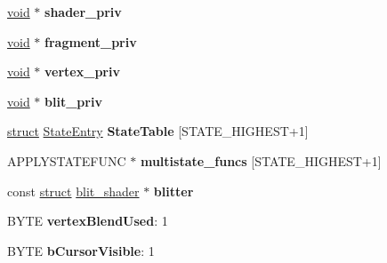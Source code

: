 \begin{DoxyCompactItemize}
\item 
\mbox{\label{structwined3d__device_a38452526a7adb7aeadeb4e82f654c290}} 
\hyperlink{interfacevoid}{void} $\ast$ {\bfseries shader\+\_\+priv}
\item 
\mbox{\label{structwined3d__device_aac1bf3c840efdf6959de17565fe1cb00}} 
\hyperlink{interfacevoid}{void} $\ast$ {\bfseries fragment\+\_\+priv}
\item 
\mbox{\label{structwined3d__device_accc9af711e4c4f877a385be8cc61a69b}} 
\hyperlink{interfacevoid}{void} $\ast$ {\bfseries vertex\+\_\+priv}
\item 
\mbox{\label{structwined3d__device_a15a452c2db8a5819ee1ce272765e54d3}} 
\hyperlink{interfacevoid}{void} $\ast$ {\bfseries blit\+\_\+priv}
\item 
\mbox{\label{structwined3d__device_a76e66f66d42b99351747a6e54a727bef}} 
\hyperlink{interfacestruct}{struct} \hyperlink{struct_state_entry}{State\+Entry} {\bfseries State\+Table} \mbox{[}S\+T\+A\+T\+E\+\_\+\+H\+I\+G\+H\+E\+ST+1\mbox{]}
\item 
\mbox{\label{structwined3d__device_a8029ef091de6e7ad06e35b37eaa7b527}} 
A\+P\+P\+L\+Y\+S\+T\+A\+T\+E\+F\+U\+NC $\ast$ {\bfseries multistate\+\_\+funcs} \mbox{[}S\+T\+A\+T\+E\+\_\+\+H\+I\+G\+H\+E\+ST+1\mbox{]}
\item 
\mbox{\label{structwined3d__device_a76a877191f74e08e1d391ad81ee4672a}} 
const \hyperlink{interfacestruct}{struct} \hyperlink{structblit__shader}{blit\+\_\+shader} $\ast$ {\bfseries blitter}
\item 
\mbox{\label{structwined3d__device_a6de57bd66bc2325bd2f41d1a5b0d37c5}} 
B\+Y\+TE {\bfseries vertex\+Blend\+Used}\+: 1
\item 
\mbox{\label{structwined3d__device_aeb9293286396c74adce202b9fb7ff11b}} 
B\+Y\+TE {\bfseries b\+Cursor\+Visible}\+: 1
\item 
\mbox{\label{structwined3d__device_a2b85651847d3b8817939b60099bea9eb}} 

\end{DoxyCompactItemize}
